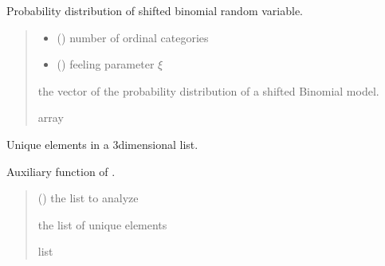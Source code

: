 \documentclass[letterpaper,10pt,english]{sphinxmanual}
\begin{document}

\begin{fulllineitems}
\label{\detokenize{cubmods:cubmods.general.probbit}}
\pysigstartsignatures
{}
\pysigstopsignatures
\sphinxAtStartPar
Probability distribution of 
shifted binomial random variable.
\begin{quote}\begin{description}
\begin{itemize}
\item {} 
\sphinxAtStartPar
{} () \textendash{} number of ordinal categories

\item {} 
\sphinxAtStartPar
{} () \textendash{} feeling parameter \(\xi\)

\end{itemize}

\sphinxAtStartPar
the vector of the probability 
distribution of a shifted Binomial 
model.

\sphinxAtStartPar
array

\end{description}\end{quote}

\end{fulllineitems}


\begin{fulllineitems}
\label{\detokenize{cubmods:cubmods.general.unique}}
\pysigstartsignatures
{}
\pysigstopsignatures
\sphinxAtStartPar
Unique elements in a 3\sphinxhyphen{}dimensional list.

\sphinxAtStartPar
Auxiliary function of .
\begin{quote}\begin{description}
\sphinxAtStartPar
{} () \textendash{} the list to analyze

\sphinxAtStartPar
the list of unique elements

\sphinxAtStartPar
list

\end{description}\end{quote}

\end{fulllineitems}
\end{document}
